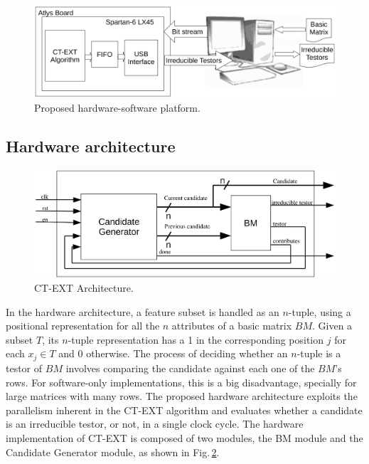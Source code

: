 \documentclass[authoryear,preprint,review,12pt]{elsarticle}
\begin{document}
\begin{figure}[htb]
    \begin{center}
        \includegraphics[width=13cm]{Arquitecture.eps}
    \end{center}
\caption{Proposed hardware-software platform.}
\label{figArq}
\end{figure}

\subsection{Hardware architecture}
\label{sect:4}

\begin{figure}[htb]
    \begin{center}
        \includegraphics[width=13cm]{CT-ext_arq.eps}
    \end{center}
\caption{CT-EXT Architecture.}
\label{fig:3}
\end{figure}

In the hardware architecture, a feature subset is handled as an $n$-tuple, using a positional 
representation for all the $n$ attributes of a basic matrix $BM$. Given a subset $T$, its $n$-tuple representation 
has a 1 in the corresponding position $j$ for each $x_j \in T$ and 0 otherwise.
The process of deciding whether an $n$-tuple is a testor of $BM$ involves
comparing the candidate against each one of the $BM$'s rows. For
software-only implementations, this is a big disadvantage, specially for large 
matrices with many rows. The proposed hardware architecture exploits the parallelism 
inherent in the CT-EXT algorithm
and evaluates whether a candidate is an irreducible testor, or not, in a single
clock cycle. The hardware implementation of CT-EXT is composed of two modules, the BM module and the Candidate Generator module, as shown in
Fig.\,\ref{fig:3}. 
\end{document}

